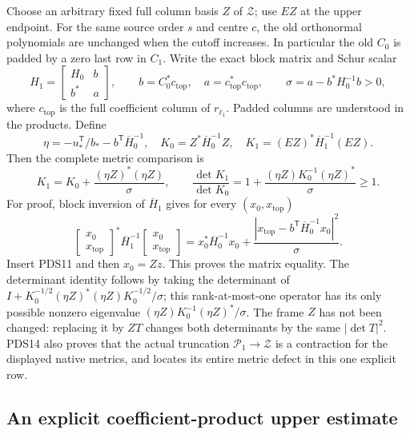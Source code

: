\documentclass[10pt]{article}
\begin{document}
Choose an arbitrary fixed full column basis $Z$ of $\mathcal Z$;
use $EZ$ at the upper endpoint. For the same source order $s$ and
centre $c$, the old orthonormal polynomials are unchanged when the
cutoff increases. In particular the old $C_0$ is padded by a zero
last row in $C_1$. Write the exact block matrix and Schur scalar
\[
 H_1=\begin{bmatrix}H_0&b\\b^*&a\end{bmatrix},\qquad
 b=C_0^*c_\mathrm{top},\quad a=c_\mathrm{top}^*c_\mathrm{top},\qquad
 \sigma=a-b^*H_0^{-1}b>0,
\tag{PDS12}
\]
where $c_\mathrm{top}$ is the full coefficient column of
$r_{\ell_1}$. Padded columns are understood in the products.
Define
\[
 \eta=-u_*^{\mathsf T}/b_*-b^{\mathsf T}\overline H_0^{-1},\quad
 K_0=Z^*\overline H_0^{-1}Z,\quad
 K_1=(EZ)^*\overline H_1^{-1}(EZ).
\tag{PDS13}
\]
Then the complete metric comparison is
\[
 \boxed{\quad K_1=K_0+\frac{(\eta Z)^*(\eta Z)}{\sigma},\qquad
 \frac{\det K_1}{\det K_0}
   =1+\frac{(\eta Z)K_0^{-1}(\eta Z)^*}{\sigma}\ge1.\quad}
\tag{PDS14}
\]
For proof, block inversion of $\overline H_1$ gives for every
$(x_0,x_\mathrm{top})$
\[
 \begin{bmatrix}x_0\\x_\mathrm{top}\end{bmatrix}^{\!*}
 \overline H_1^{-1}
 \begin{bmatrix}x_0\\x_\mathrm{top}\end{bmatrix}
 =x_0^*\overline H_0^{-1}x_0
  +\frac{|x_\mathrm{top}-b^{\mathsf T}
                    \overline H_0^{-1}x_0|^2}{\sigma}.
\tag{PDS15}
\]
Insert PDS11 and then $x_0=Zz$. This proves the matrix equality.
The determinant identity follows by taking the determinant of
$I+K_0^{-1/2}(\eta Z)^*(\eta Z)K_0^{-1/2}/\sigma$;
this rank-at-most-one operator has its only possible nonzero
eigenvalue $(\eta Z)K_0^{-1}(\eta Z)^*/\sigma$.
The frame $Z$ has not been changed: replacing it by $ZT$ changes
both determinants by the same $|\det T|^2$. PDS14 also proves
that the actual truncation $\mathcal P_1\to\mathcal Z$ is a
contraction for the displayed native metrics, and locates its
entire metric defect in this one explicit row.

\subsection{An explicit coefficient-product upper estimate}
\end{document}
